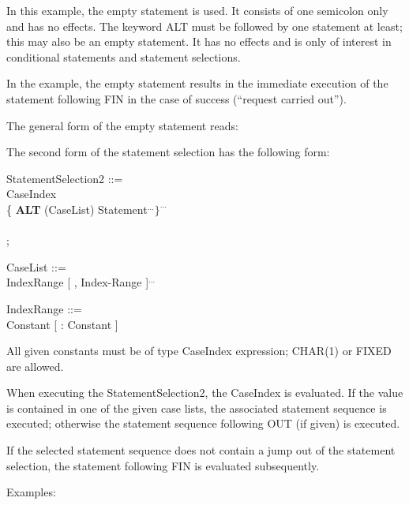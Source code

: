 In this example, the empty statement is used. It consists of one
semicolon only and has no effects. The keyword ALT must be followed by
one statement at least; this may also be an empty statement. It has no
effects and is only of interest in conditional statements and statement
selections.

In the example, the empty statement results in the immediate execution
of the statement following FIN in the case of success (``request carried
out'').

The general form of the empty statement reads:



The second form of the statement selection has the following form:

\begin{front}
StatementSelection2 ::= \\
 CaseIndex\\
\x \{ {\bf ALT} (CaseList) Statement$^{...} \}^{...}$ \\
 \\
;
\end{front}
\begin{grammar}

\end{grammar}



\begin{front}
CaseList ::= \\
\x IndexRange [ , Index-Range ]$^{...}$

IndexRange ::= \\
\x Constant [ : Constant ]
\end{front}
\begin{grammar}


\end{grammar}

All given constants must be of type CaseIndex expression; CHAR(1) or
FIXED are allowed.

When executing the StatementSelection2, the CaseIndex is evaluated.
If the value is contained in one of the given case lists, the associated
statement sequence is executed; otherwise the statement sequence
following OUT (if given) is executed.

If the selected statement sequence does not contain a jump out of the
statement selection, the statement following FIN is evaluated
subsequently.

Examples:

